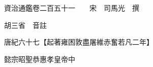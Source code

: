 










 


 
 


 

  
  
  
  
  





  
  
  
  
  
 
  

  

  
  
  



  

 
 

  
   




  

  
  


  　　資治通鑑卷二百五十一　　宋　司馬光　撰

　　胡三省　音註

　　唐紀六十七【起著雍困敦盡屠維赤奮若凡二年】

　　懿宗昭聖恭惠孝皇帝中

